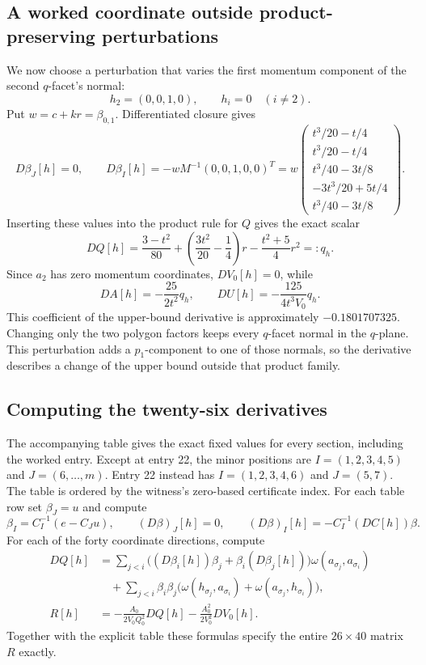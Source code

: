 \subsection*{A worked coordinate outside product-preserving perturbations}
We now choose a perturbation that varies the first momentum component of
the second $q$-facet's normal:
\[
 h_2=(0,0,1,0),\qquad h_i=0\quad(i\ne2).
\]
Put $w=c+kr=\beta_{0,1}$. Differentiated closure gives
\[
 D\beta_J[h]=0,\qquad D\beta_I[h]=-wM^{-1}(0,0,1,0,0)^T
 =w\begin{pmatrix}
 t^3/20-t/4\\t^3/20-t/4\\t^3/40-3t/8\\-3t^3/20+5t/4\\t^3/40-3t/8
 \end{pmatrix}.
\]
Inserting these values into the product rule for $Q$ gives the exact scalar
\[
 DQ[h]=\frac{3-t^2}{80}+
 \left(\frac{3t^2}{20}-\frac14\right)r
 -\frac{t^2+5}{4}r^2=:q_h.
\]
Since $a_2$ has zero momentum coordinates, $DV_0[h]=0$, while
\[
 DA[h]=-\frac{25}{2t^2}q_h,\qquad
 DU[h]=-\frac{125}{4t^3V_0}q_h.
\]
This coefficient of the upper-bound derivative is approximately
$-0.1801707325$. Changing only the two polygon factors keeps every
$q$-facet normal in the $q$-plane. This perturbation adds a $p_1$-component
to one of those normals, so the derivative describes a change of the upper
bound outside that product family.

\subsection{Computing the twenty-six derivatives}
\label{subsec:hko-local-maximum-computation-with-sagemath}
The accompanying table gives the exact fixed values for every section,
including the worked entry. Except at entry 22, the minor positions are $I=(1,2,3,4,5)$ and
$J=(6,\ldots,m)$. Entry 22 instead has $I=(1,2,3,4,6)$ and $J=(5,7)$.
The table is ordered by the witness's zero-based certificate
index. For each table row set $\beta_J=u$ and compute
\[
 \beta_I=C_I^{-1}(e-C_Ju),\qquad
 (D\beta)_J[h]=0,\qquad
 (D\beta)_I[h]=-C_I^{-1}(DC[h])\beta.
\]
For each of the forty coordinate directions, compute
\begin{align*}
 DQ[h]&=\sum_{j<i}\bigl((D\beta_i[h])\beta_j+\beta_i(D\beta_j[h])\bigr)
       \omega(a_{\sigma_j},a_{\sigma_i})\\
 &\quad+\sum_{j<i}\beta_i\beta_j
 \bigl(\omega(h_{\sigma_j},a_{\sigma_i})+\omega(a_{\sigma_j},h_{\sigma_i})\bigr),\\
 R[h]&=-\frac{A_0}{2V_0Q_0^2}DQ[h]
       -\frac{A_0^2}{2V_0^2}DV_0[h].
\end{align*}
Together with the explicit table these formulas specify the entire
$26\times40$ matrix $R$ exactly.

